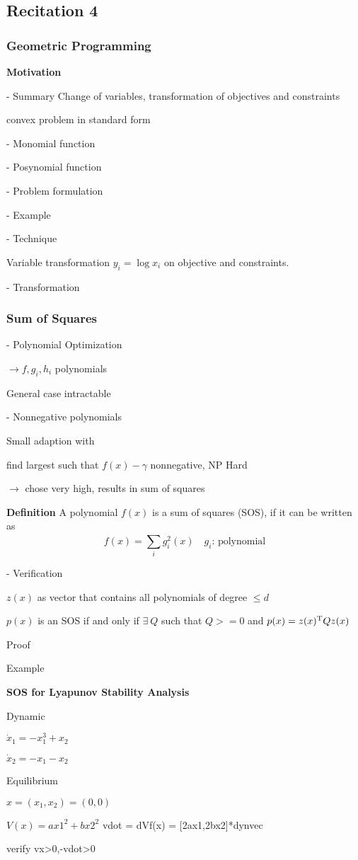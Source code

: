 \subsection{Recitation 4}

\subsubsection{Geometric Programming}

\textbf{Motivation}

- Summary Change of variables, transformation of objectives and constraints

\rightarrow convex problem in standard form

- Monomial function

- Posynomial function

- Problem formulation

- Example

- Technique

Variable transformation $y_i=\log{x_i}$ on objective and constraints.

- Transformation




\subsubsection{Sum of Squares}

- Polynomial Optimization

$\rightarrow f,g_i,h_i$ polynomials

General case intractable

- Nonnegative polynomials

Small adaption with \gamma

find largest \gamma such that $f(x)-\gamma$ nonnegative, NP Hard

$\rightarrow$ chose \gamma very high, results in sum of squares

\textbf{Definition}
A polynomial $f(x)$ is a sum of squares (SOS), if it can be written as
$$f(x) = \displaystyle\sum_{i}^{}g_i^2(x) \quad g_i \text{: polynomial}$$

- Verification

$z(x)$ as vector that contains all polynomials of degree $\le d$

\begin{theorem}[SOS]
	$p(x)$ is an SOS if and only if $\exists\ Q$ such that $Q >=0$ and $p(x)=z(x)^{\textnormal{\scriptsize T}}Qz(x)$
\end{theorem}

Proof

Example

\textbf{SOS for Lyapunov Stability Analysis}

Dynamic

$\dot{x}_1 = -x_1^3+x_2$

$\dot{x}_2 = -x_1-x_2$

Equilibrium


$x = (x_1,x_2) = (0,0)$

$V(x) = ax1^2+bx2^2$
vdot = dVf(x)
= [2ax1,2bx2]*dynvec

verify vx>0,-vdot>0
